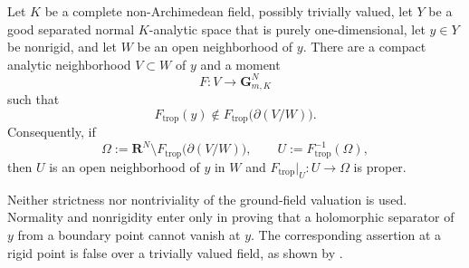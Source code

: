 
\begin{lemma}
\label{lem:p213-normal-curve-nonrigid-localization}
Let $K$ be a complete non-Archimedean field, possibly trivially valued,
let $Y$ be a good separated normal $K$-analytic space that is purely
one-dimensional, let $y\in Y$ be nonrigid, and let $W$ be an open
neighborhood of $y$.  There are a compact analytic neighborhood
$V\subset W$ of $y$ and a moment
\[
             F:V\longrightarrow\mathbf G_{m,K}^{N}
\]
such that
\begin{equation}
\label{eq:p213-normal-curve-nonrigid-boundary}
 F_{\mathrm{trop}}(y)\notin
 F_{\mathrm{trop}}\bigl(\partial(V/W)\bigr).
\end{equation}
Consequently, if
\[
 \Omega:=\mathbf R^N\setminus
 F_{\mathrm{trop}}\bigl(\partial(V/W)\bigr),
 \qquad
 U:=F_{\mathrm{trop}}^{-1}(\Omega),
\]
then $U$ is an open neighborhood of $y$ in $W$ and
$F_{\mathrm{trop}}|_U:U\to\Omega$ is proper.
\end{lemma}

\begin{remark}
\label{rem:p213-normal-curve-nonrigid-localization-scope}
Neither strictness nor nontriviality of the ground-field valuation is used.
Normality and nonrigidity enter only in proving that a holomorphic separator
of $y$ from a boundary point cannot vanish at $y$.  The corresponding
assertion at a rigid point is false over a trivially valued field, as shown
by \cite[Remark~12.3.7]{CLD25}.
\end{remark}

